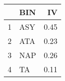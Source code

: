 \begin{table}[ht]
\centering
\begin{tabular}{rlr}
  \hline
 & BIN & IV \\ 
  \hline
1 & ASY & 0.45 \\ 
  2 & ATA & 0.23 \\ 
  3 & NAP & 0.26 \\ 
  4 & TA & 0.11 \\ 
   \hline
\end{tabular}
\end{table}
